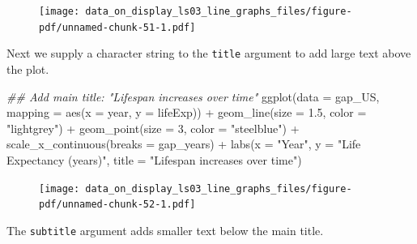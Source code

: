 \documentclass[
  letterpaper,
  DIV=11,
  numbers=noendperiod]{scrreprt}
\newenvironment{Shaded}{\begin{snugshade}}{\end{snugshade}}
\newcommand{\AttributeTok}[1]{\textcolor[rgb]{0.40,0.45,0.13}{#1}}
\newcommand{\DecValTok}[1]{\textcolor[rgb]{0.68,0.00,0.00}{#1}}
\newcommand{\DocumentationTok}[1]{\textcolor[rgb]{0.37,0.37,0.37}{\textit{#1}}}
\newcommand{\FloatTok}[1]{\textcolor[rgb]{0.68,0.00,0.00}{#1}}
\newcommand{\FunctionTok}[1]{\textcolor[rgb]{0.28,0.35,0.67}{#1}}
\newcommand{\NormalTok}[1]{\textcolor[rgb]{0.00,0.23,0.31}{#1}}
\newcommand{\SpecialCharTok}[1]{\textcolor[rgb]{0.37,0.37,0.37}{#1}}
\newcommand{\StringTok}[1]{\textcolor[rgb]{0.13,0.47,0.30}{#1}}
\begin{document}
\begin{figure}[H]

{\centering \texttt{[image: data\_on\_display\_ls03\_line\_graphs\_files/figure-pdf/unnamed-chunk-51-1.pdf]}

}

\end{figure}

Next we supply a character string to the \texttt{title} argument to add
large text above the plot.

\begin{Shaded}
\begin{Highlighting}[]
\DocumentationTok{\#\# Add main title: "Lifespan increases over time"}
\FunctionTok{ggplot}\NormalTok{(}\AttributeTok{data =}\NormalTok{ gap\_US, }
       \AttributeTok{mapping =} \FunctionTok{aes}\NormalTok{(}\AttributeTok{x =}\NormalTok{ year, }
                     \AttributeTok{y =}\NormalTok{ lifeExp)) }\SpecialCharTok{+}
  \FunctionTok{geom\_line}\NormalTok{(}\AttributeTok{size =} \FloatTok{1.5}\NormalTok{, }
            \AttributeTok{color =} \StringTok{"lightgrey"}\NormalTok{) }\SpecialCharTok{+}
  \FunctionTok{geom\_point}\NormalTok{(}\AttributeTok{size =} \DecValTok{3}\NormalTok{, }
             \AttributeTok{color =} \StringTok{"steelblue"}\NormalTok{) }\SpecialCharTok{+}
  \FunctionTok{scale\_x\_continuous}\NormalTok{(}\AttributeTok{breaks =}\NormalTok{ gap\_years) }\SpecialCharTok{+}
  \FunctionTok{labs}\NormalTok{(}\AttributeTok{x =} \StringTok{"Year"}\NormalTok{,}
       \AttributeTok{y =} \StringTok{"Life Expectancy (years)"}\NormalTok{,}
       \AttributeTok{title =} \StringTok{"Lifespan increases over time"}\NormalTok{)}
\end{Highlighting}
\end{Shaded}

\begin{figure}[H]

{\centering \texttt{[image: data\_on\_display\_ls03\_line\_graphs\_files/figure-pdf/unnamed-chunk-52-1.pdf]}

}

\end{figure}

The \texttt{subtitle} argument adds smaller text below the main title.
\end{document}
